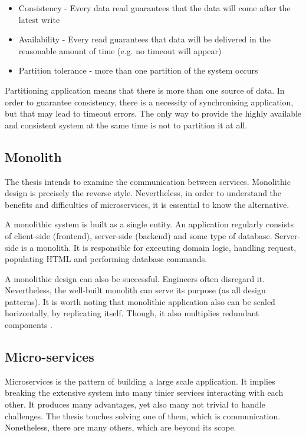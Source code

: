 \begin{itemize}
    \item Consistency - Every data read guarantees that the data will come after the latest write
    \item Availability - Every read guarantees that data will be delivered in the reasonable amount of time (e.g. no timeout will appear)
    \item Partition tolerance - more than one partition of the system occurs
\end{itemize}

Partitioning application means that there is more than one source of data. In order to guarantee consistency, there is a necessity of synchronising application, but that may lead to timeout errors. The only way to provide the highly available and consistent system at the same time is not to partition it at all. 


\subsection{Monolith}
\label{subsec:monolith}

The thesis intends to examine the communication between services. Monolithic design is precisely the reverse style. Nevertheless, in order to understand the benefits and difficulties of microservices, it is essential to know the alternative. 

A monolithic system is built as a single entity. An application regularly consists of client-side (frontend), server-side (backend) and some type of database. Server-side is a monolith. It is responsible for executing domain logic, handling request, populating HTML and performing database commands. 

A monolithic design can also be successful. Engineers often disregard it. Nevertheless, the well-built monolith can serve its purpose (as all design patterns). It is worth noting that monolithic application also can be scaled horizontally, by replicating itself. Though, it also multiplies redundant components \cite{microservices}.

\subsection{Micro-services}
\label{subsec:microservices}

Microservices is the pattern of building a large scale application. It implies breaking the extensive system into many tinier services interacting with each other. It produces many advantages, yet also many not trivial to handle challenges. The thesis touches solving one of them, which is communication. Nonetheless, there are many others, which are beyond its scope.


